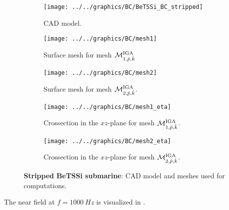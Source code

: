 \begin{figure}
	\begin{subfigure}{\textwidth}
		\centering
		\texttt{[image: ../../graphics/BC/BeTSSi\_BC\_stripped]}
		\caption{CAD model.}
		\label{Fig2:BC_stripped}
	\end{subfigure}
	\par\bigskip
	\par\bigskip
	\begin{subfigure}{\textwidth}
		\centering
		\texttt{[image: ../../graphics/BC/mesh1]}
		\caption{Surface mesh for mesh ${\cal M}_{1,\check{p},\check{k}}^{\mathrm{IGA}}$}
	\end{subfigure}	
	\par\bigskip
	\par\bigskip
	\begin{subfigure}{\textwidth}
		\centering
		\texttt{[image: ../../graphics/BC/mesh2]}
		\caption{Surface mesh for mesh ${\cal M}_{2,\check{p},\check{k}}^{\mathrm{IGA}}$.}
	\end{subfigure}	
	\par\bigskip
	\par\bigskip
	\begin{subfigure}{\textwidth}
		\centering
		\texttt{[image: ../../graphics/BC/mesh1\_eta]}
		\caption{Crossection in the $xz$-plane for mesh ${\cal M}_{1,\check{p},\check{k}}^{\mathrm{IGA}}$.}
	\end{subfigure}	
	\par\bigskip
	\par\bigskip
	\begin{subfigure}{\textwidth}
		\centering
		\texttt{[image: ../../graphics/BC/mesh2\_eta]}
		\caption{Crossection in the $xz$-plane for mesh ${\cal M}_{2,\check{p},\check{k}}^{\mathrm{IGA}}$.}
	\end{subfigure}	
	\caption{\textbf{Stripped BeTSSi submarine}: CAD model and meshes used for computations.}
	\label{Fig2:BC_strippedAndMesh}
\end{figure}
The near field at $f=\SI{1000}{Hz}$ is visualized in .
